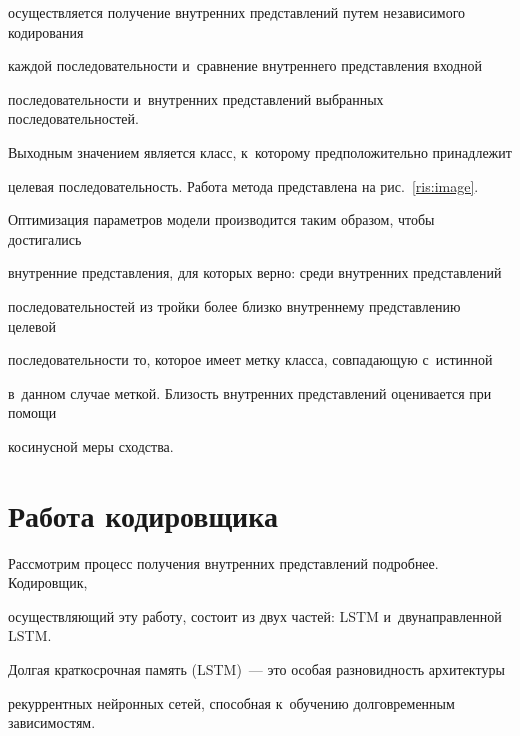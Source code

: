 осуществляется получение внут\-рен\-них представлений путем независимого кодирования 

каждой последовательности и~сравнение внут\-рен\-не\-го представления входной 

последовательности и~внутренних представлений выбранных последовательностей. 

Выходным значением является класс, к~которому предположительно принадлежит 

целевая последовательность. Работа метода пред\-став\-ле\-на на рис.~\ref{ris:image}.







Оптимизация параметров модели производится таким образом, чтобы достигались 

внутренние представления, для которых верно: среди внут\-рен\-них представлений 

последовательностей из тройки более близ\-ко внут\-рен\-не\-му представлению целевой 

последовательности то, которое имеет метку класса, совпадающую с~истинной 

в~данном случае меткой. Близость внутренних представлений оценивается при помощи 

косинусной меры сходства.





\section{Работа кодировщика}



Рассмотрим процесс получения внутренних представлений подробнее. Кодировщик, 

осуществляющий эту работу, состоит из двух частей: LSTM и~дву\-на\-прав\-лен\-ной LSTM. 

Долгая краткосрочная память (LSTM)~--- это особая разновидность архитектуры 

рекуррентных нейронных сетей, способная к~обучению долговременным зависимостям. 

